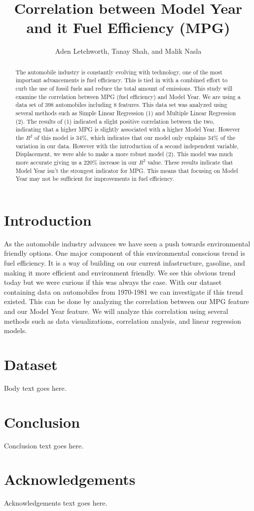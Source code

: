 \documentclass[journal]{IEEEtran}
\title{Correlation between Model Year and it Fuel Efficiency
(MPG)}
\author{Aden Letchworth, Tanay Shah, and Malik Nasla}
\begin{document}
\maketitle

\begin{abstract}
The automobile industry is constantly evolving with technology, 
one of the most important advancements is fuel efficiency. 
This is tied in with a combined effort to curb the use of fossil fuels and reduce the total amount of emissions. 
This study will examine the correlation between MPG (fuel efficiency) and Model Year. 
We are using a data set of 398 automobiles including 8 features. 
This data set was analyzed using several methods such as Simple Linear Regression (1) and Multiple Linear Regression (2). 
The results of (1) indicated a slight positive correlation between the two, indicating that a higher MPG is slightly associated with a higher Model Year. 
However the $R^{2}$ of this model is 34\%, which indicates that our model only explains 34\% of the variation in our data. 
However with the introduction of a second independent variable, Displacement, we were able to make a more robust model (2). 
This model was much more accurate giving us a 220\% increase in our $R^{2}$ value. 
These results indicate that Model Year isn't the strongest indicator for MPG. 
This means that focusing on Model Year may not be sufficient for improvements in fuel efficiency.
\end{abstract}

\section{Introduction}
As the automobile industry advances we have seen a push towards environmental friendly options.
One major component of this environmental conscious trend is fuel efficiency. 
It is a way of building on our current infastructure, gasoline, and making it more efficient and environment friendly. 
We see this obvious trend today but we were curious if this was always the case. 
With our dataset containing data on automobiles from 1970-1981 we can investigate if this trend existed. 
This can be done by analyzing the correlation between our MPG feature and our Model Year feature. 
We will analyze this correlation using several methods such as data visualizations, correlation analysis, and linear regression models.


\section{Dataset}
Body text goes here.

\section{Conclusion}
Conclusion text goes here.

\section*{Acknowledgements}
Acknowledgements text goes here.




\end{document}
